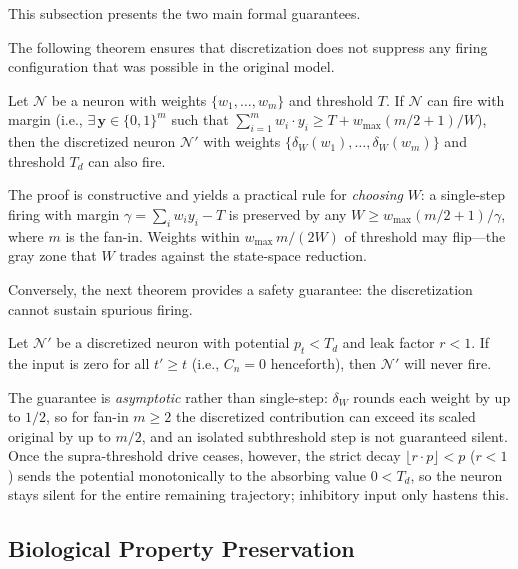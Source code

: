 \documentclass[runningheads]{llncs}
\begin{document}
This subsection presents the two main formal guarantees.

The following theorem ensures that discretization does not suppress any firing
configuration that was possible in the original model.

\begin{theorem}\label{thm:threshold}
Let $\mathcal{N}$ be a neuron with weights $\{w_1, \dots, w_m\}$ and threshold
$T$. If $\mathcal{N}$ can fire with margin (i.e., $\exists\, \mathbf{y} \in
\{0,1\}^m$ such that $\sum_{i=1}^{m} w_i \cdot y_i \geq T + w_{\max}(m/2+1)/W$),
then the discretized neuron $\mathcal{N}'$ with weights
$\{\delta_W(w_1), \dots, \delta_W(w_m)\}$ and threshold $T_d$ can also fire.
\end{theorem}

The proof is constructive and yields a practical rule for \emph{choosing} $W$: a
single-step firing with margin $\gamma = \sum_i w_i y_i - T$ is preserved by any
$W \geq w_{\max}(m/2 + 1)/\gamma$, where $m$ is the fan-in. Weights within
$w_{\max}\, m / (2W)$ of threshold may flip---the gray zone that $W$ trades
against the state-space reduction.

Conversely, the next theorem provides a safety guarantee: the discretization
cannot sustain spurious firing.

\begin{theorem}\label{thm:silence}
Let $\mathcal{N}'$ be a discretized neuron with potential $p_t < T_d$ and leak
factor $r < 1$. If the input is zero for all $t' \geq t$ (i.e., $C_n = 0$
henceforth), then $\mathcal{N}'$ will never fire.
\end{theorem}

The guarantee is \emph{asymptotic} rather than single-step: $\delta_W$ rounds
each weight by up to $1/2$, so for fan-in $m \geq 2$ the discretized contribution
can exceed its scaled original by up to $m/2$, and an isolated subthreshold step
is not guaranteed silent. Once the supra-threshold drive ceases, however, the
strict decay $\lfloor r \cdot p \rfloor < p$ ($r < 1$) sends the potential
monotonically to the absorbing value $0 < T_d$, so the neuron stays silent for
the entire remaining trajectory; inhibitory input only hastens this.

\subsection{Biological Property Preservation}\label{sec:bio-preservation}
\end{document}
